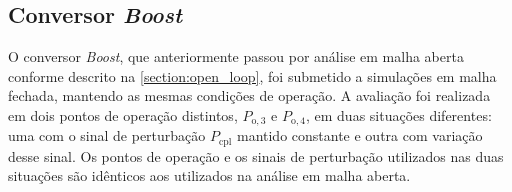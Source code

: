 \subsection{Conversor \textit{Boost}}

O conversor \textit{Boost}, que anteriormente passou por análise em malha aberta conforme descrito na \autoref{section:open_loop}, foi submetido a simulações em malha fechada, mantendo as mesmas condições de operação. A avaliação foi realizada em dois pontos de operação distintos, $P_{\mathrm{o}, 3}$ e $P_{\mathrm{o}, 4}$, em duas situações diferentes: uma com o sinal de perturbação $P_{\mathrm{cpl}}$ mantido constante e outra com variação desse sinal. Os pontos de operação e os sinais de perturbação utilizados nas duas situações são idênticos aos utilizados na análise em malha aberta.

